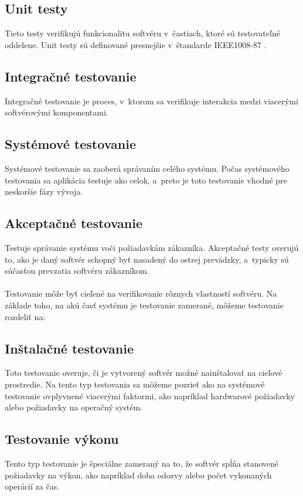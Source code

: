 \subsection*{Unit testy}
Tieto testy verifikujú funkcionalitu softvéru v~častiach, ktoré sú testovateľné oddelene.
Unit testy sú definované presnejšie v~štandarde IEEE1008-87 \cite{Ieee_unit}.
\subsection*{Integračné testovanie}
Integračné testovanie je proces, v~ktorom sa verifikuje interakcia medzi viacerými softvérovými komponentami.
\subsection*{Systémové testovanie}
Systémové testovanie sa zaoberá správaním celého systému. Počas systémového testovania sa aplikácia testuje ako celok,
a~preto je toto testovanie vhodné pre neskoršie fázy vývoja.
\subsection*{Akceptačné testovanie}
Testuje správanie systému voči požiadavkám zákazníka. Akceptačné testy overujú to, ako je daný softvér 
schopný byť nasadený do ostrej prevádzky, a~typicky sú súčasťou prevzatia softvéru zákazníkom.
\\
\\
Testovanie môže byť cieľené na verifikovanie rôznych vlastností softvéru. Na základe toho, na akú časť systému je 
testovanie zamerané, môžeme testovanie rozdeliť na:
\subsection*{Inštalačné testovanie}
Toto testovanie overuje, či je vytvorený softvér možné nainštalovať
na cieľové prostredie. Na tento typ testovania sa môžeme pozrieť ako na 
systémové testovanie ovplyvnené viacerými faktormi, ako napríklad hardwarové požiadavky
alebo požiadavky na operačný systém. 
\subsection*{Testovanie výkonu}
Tento typ testovanie je špeciálne zameraný na to, že softvér spĺňa stanovené požiadavky 
na výkon, ako napríklad doba odozvy alebo počet vykonaných operácií za čas. 
